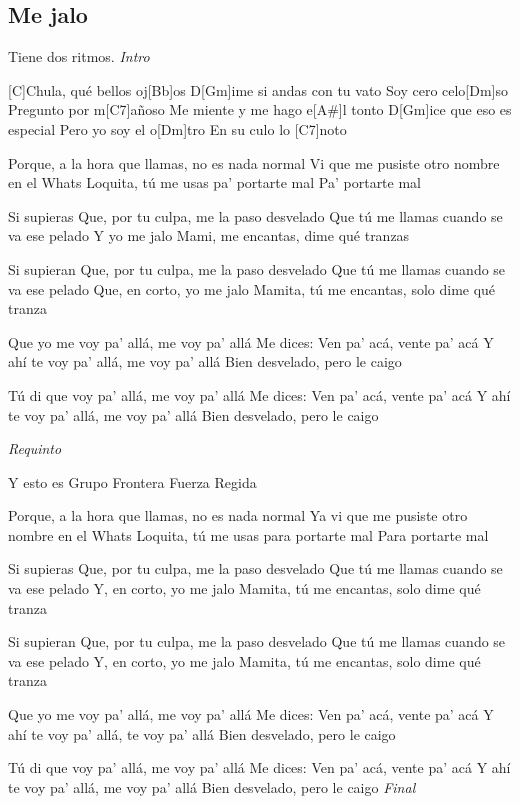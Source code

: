 \subsection{Me jalo}
\noindent

\vspace{1cm}

\begin{guitar}
	\begin{multicols}{2}

		Tiene dos ritmos.
		\textit{Intro}

		[C]Chula, qué bellos oj[Bb]os
		D[Gm]ime si andas con tu vato
		Soy cero celo[Dm]so
		Pregunto por m[C7]añoso
		Me miente y me hago e[A#]l tonto
		D[Gm]ice que eso es especial
		Pero yo soy el o[Dm]tro
		En su culo lo [C7]noto

	Porque, a la hora que llamas, no es nada normal
	Vi que me pusiste otro nombre en el Whats
	Loquita, tú me usas pa' portarte mal
	Pa’ portarte mal

	Si supieras
	Que, por tu culpa, me la paso desvelado
	Que tú me llamas cuando se va ese pelado
	Y yo me jalo
	Mami, me encantas, dime qué tranzas

	Si supieran
	Que, por tu culpa, me la paso desvelado
	Que tú me llamas cuando se va ese pelado
	Que, en corto, yo me jalo
	Mamita, tú me encantas, solo dime qué tranza

	Que yo me voy pa' allá, me voy pa' allá
	Me dices: Ven pa’ acá, vente pa' acá
	Y ahí te voy pa' allá, me voy pa' allá
	Bien desvelado, pero le caigo

	Tú di que voy pa' allá, me voy pa' allá
	Me dices: Ven pa' acá, vente pa' acá
	Y ahí te voy pa’ allá, me voy pa’ allá
	Bien desvelado, pero le caigo

	\par
	\textit{Requinto}

	Y esto es Grupo Frontera
	Fuerza Regida
	\par

	Porque, a la hora que llamas, no es nada normal
	Ya vi que me pusiste otro nombre en el Whats
	Loquita, tú me usas para portarte mal
	Para portarte mal

	Si supieras
	Que, por tu culpa, me la paso desvelado
	Que tú me llamas cuando se va ese pelado
	Y, en corto, yo me jalo
	Mamita, tú me encantas, solo dime qué tranza

	Si supieran
	Que, por tu culpa, me la paso desvelado
	Que tú me llamas cuando se va ese pelado
	Y, en corto, yo me jalo
	Mamita, tú me encantas, solo dime qué tranza

	Que yo me voy pa' allá, me voy pa’ allá
	Me dices: Ven pa' acá, vente pa' acá
	Y ahí te voy pa' allá, te voy pa’ allá
	Bien desvelado, pero le caigo

	Tú di que voy pa' allá, me voy pa' allá
	Me dices: Ven pa' acá, vente pa' acá
	Y ahí te voy pa' allá, me voy pa' allá
	Bien desvelado, pero le caigo
		\textit{Final}
	\end{multicols}
\end{guitar}
